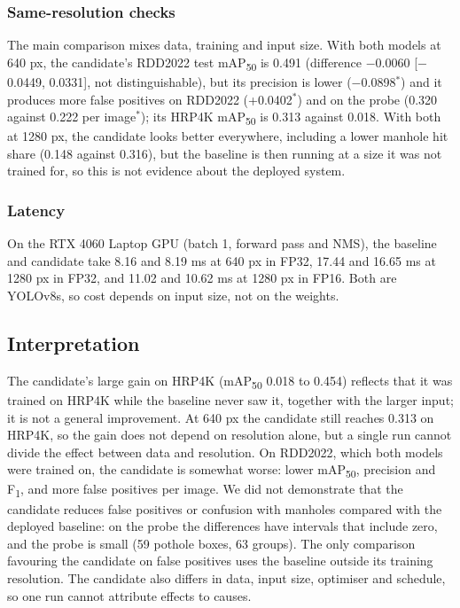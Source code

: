 \subsubsection*{Same-resolution checks}
The main comparison mixes data, training and input size. With both models at 640 px, the candidate's RDD2022 test mAP\textsubscript{50} is 0.491 (difference $-$0.0060 [$-$0.0449, 0.0331], not distinguishable), but its precision is lower ($-$0.0898$^{*}$) and it produces more false positives on RDD2022 (+0.0402$^{*}$) and on the probe (0.320 against 0.222 per image$^{*}$); its HRP4K mAP\textsubscript{50} is 0.313 against 0.018. With both at 1280 px, the candidate looks better everywhere, including a lower manhole hit share (0.148 against 0.316), but the baseline is then running at a size it was not trained for, so this is not evidence about the deployed system.

\subsubsection*{Latency}
On the RTX 4060 Laptop GPU (batch 1, forward pass and NMS), the baseline and candidate take 8.16 and 8.19 ms at 640 px in FP32, 17.44 and 16.65 ms at 1280 px in FP32, and 11.02 and 10.62 ms at 1280 px in FP16. Both are YOLOv8s, so cost depends on input size, not on the weights.

\subsection{Interpretation}
The candidate's large gain on HRP4K (mAP\textsubscript{50} 0.018 to 0.454) reflects that it was trained on HRP4K while the baseline never saw it, together with the larger input; it is not a general improvement. At 640 px the candidate still reaches 0.313 on HRP4K, so the gain does not depend on resolution alone, but a single run cannot divide the effect between data and resolution. On RDD2022, which both models were trained on, the candidate is somewhat worse: lower mAP\textsubscript{50}, precision and F\textsubscript{1}, and more false positives per image. We did not demonstrate that the candidate reduces false positives or confusion with manholes compared with the deployed baseline: on the probe the differences have intervals that include zero, and the probe is small (59 pothole boxes, 63 groups). The only comparison favouring the candidate on false positives uses the baseline outside its training resolution. The candidate also differs in data, input size, optimiser and schedule, so one run cannot attribute effects to causes.

